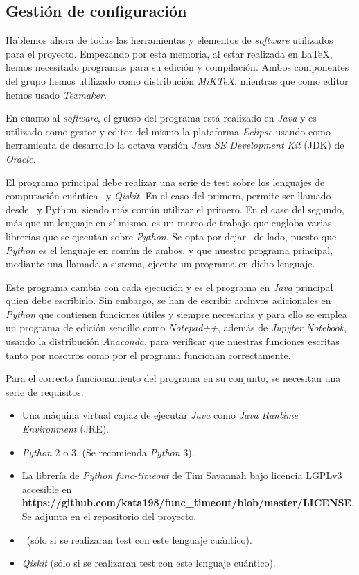 \subsection{Gestión de configuración}

Hablemos ahora de todas las herramientas y elementos de \textit{software} utilizados para el proyecto. Empezando por esta memoria, al estar realizada en \LaTeX, hemos necesitado programas para su edición y compilación. Ambos componentes del grupo hemos utilizado como distribución \textit{MiKTeX}, mientras que como editor hemos usado \textit{Texmaker}.

En cuanto al \textit{software}, el grueso del programa está realizado en \textit{Java} y es utilizado como gestor y editor del mismo la plataforma \textit{Eclipse} usando como herramienta de desarrollo la octava versión \textit{Java SE Development Kit} (JDK) de \textit{Oracle}.

El programa principal debe realizar una serie de test sobre los lenguajes de computación cuántica \qsh\ y \textit{Qiskit}. En el caso del primero, permite ser llamado desde \csh\ y {Python}, siendo más común utilizar el primero. En el caso del segundo, más que un lenguaje en sí mismo, es un marco de trabajo que engloba varias librerías que se ejecutan sobre \textit{Python}. Se opta por dejar \csh\ de lado, puesto que \textit{Python} es el lenguaje en común de ambos, y que nuestro programa principal, mediante una llamada a sistema, ejecute un programa en dicho lenguaje.

Este programa cambia con cada ejecución y es el programa en \textit{Java} principal quien debe escribirlo. Sin embargo, se han de escribir archivos adicionales en \textit{Python} que contienen funciones útiles y siempre necesarias y para ello se emplea un programa de edición sencillo como \textit{Notepad++}, además de \textit{Jupyter Notebook}, usando la distribución \textit{Anaconda}, para verificar que nuestras funciones escritas tanto por nosotros como por el programa funcionan correctamente.

Para el correcto funcionamiento del programa en su conjunto, se necesitan una serie de requisitos.

\begin{itemize}
\item Una máquina virtual capaz de ejecutar \textit{Java} como \textit{Java Runtime Environment} (JRE).
\item \textit{Python} 2 o 3. (Se recomienda \textit{Python} 3).
\item La librería de \textit{Python} \textit{func-timeout} de Tim Savannah bajo licencia LGPLv3 accesible en \textbf{https://github.com/kata198/func\_timeout/blob/master/LICENSE}. Se adjunta en el repositorio del proyecto.
\item \qsh\ (sólo si se realizaran test con este lenguaje cuántico).
\item \textit{Qiskit} (sólo si se realizaran test con este lenguaje cuántico).
\end{itemize}

